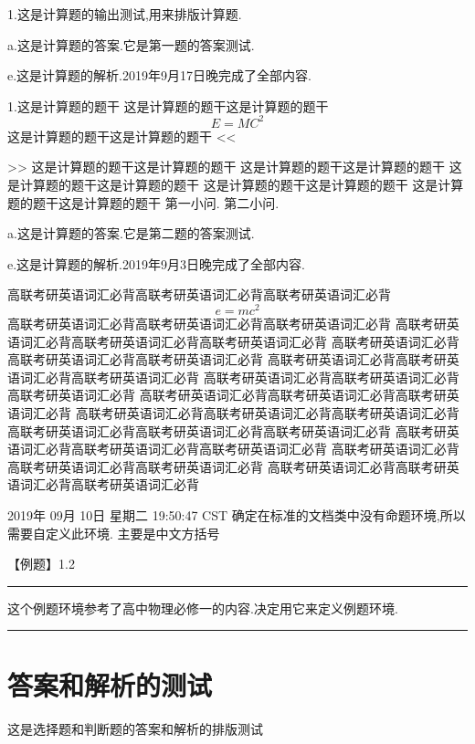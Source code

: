 \documentclass[a4paper,fontset = windowsnew]{ctexbook}
\begin{document}
\begin{calculations}
  1.这是计算题的输出测试,用来排版计算题.

  a.这是计算题的答案.它是第一题的答案测试.

e.这是计算题的解析.2019年9月17日晚完成了全部内容.

1.这是计算题的题干
这是计算题的题干这是计算题的题干
\[  E=MC^2 \]
这是计算题的题干这是计算题的题干
<<
>>
这是计算题的题干这是计算题的题干
这是计算题的题干这是计算题的题干
这是计算题的题干这是计算题的题干
这是计算题的题干这是计算题的题干
这是计算题的题干这是计算题的题干
\qitem 第一小问.
\qitem 第二小问.

  a.这是计算题的答案.它是第二题的答案测试.

e.这是计算题的解析.2019年9月3日晚完成了全部内容.

\end{calculations}

%
高联考研英语词汇必背高联考研英语词汇必背高联考研英语词汇必背
\[e=mc^2\]
高联考研英语词汇必背高联考研英语词汇必背高联考研英语词汇必背
高联考研英语词汇必背高联考研英语词汇必背高联考研英语词汇必背
高联考研英语词汇必背高联考研英语词汇必背高联考研英语词汇必背
高联考研英语词汇必背高联考研英语词汇必背高联考研英语词汇必背
高联考研英语词汇必背高联考研英语词汇必背高联考研英语词汇必背
高联考研英语词汇必背高联考研英语词汇必背高联考研英语词汇必背
高联考研英语词汇必背高联考研英语词汇必背高联考研英语词汇必背
高联考研英语词汇必背高联考研英语词汇必背高联考研英语词汇必背
高联考研英语词汇必背高联考研英语词汇必背高联考研英语词汇必背
高联考研英语词汇必背高联考研英语词汇必背高联考研英语词汇必背
高联考研英语词汇必背高联考研英语词汇必背高联考研英语词汇必背



2019年 09月 10日 星期二 19:50:47 CST
确定在标准的文档类中没有命题环境,所以需要自定义此环境.
主要是中文方括号

\parindent=0pt
【{\heiti 例题}】1.2
\vspace{2pt}
\hrule
\vspace{10pt}

\ccwd
 这个例题环境参考了高中物理必修一的内容.决定用它来定义例题环境.

\vspace{10pt}
\hrule

\newpage
\section{答案和解析的测试}

这是选择题和判断题的答案和解析的排版测试

\makeanswer
\end{document}
